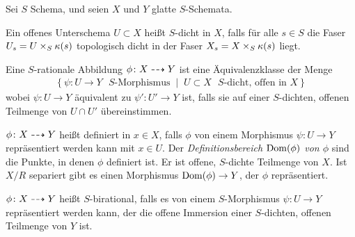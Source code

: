 \documentclass[german]{scrreprt}
\begin{document}
\begin{Definition}\label{def:ratabb}
  \cite[Chapter 2.5]{neron}
  Sei $S$ Schema, und seien $X$ und $Y$ glatte $S$-Schemata.

  Ein offenes Unterschema $U\subset X$ heißt $S$-dicht in $X$, falls
  für alle $s\in S$ die Faser $U_s=U\times_S\kappa(s)$ topologisch dicht
  in der Faser $X_s=X\times_S\kappa(s)$ liegt.

  Eine $S$-rationale Abbildung $\phi\colon X\dashrightarrow Y$ ist eine
  Äquivalenzklasse der Menge
  \begin{gather*}
    \left\{
      \psi\colon U\to Y \text{ $S$-Morphismus}
      \;\middle|\;
      U\subset X \text{ $S$-dicht, offen in $X$}
    \right\}
  \end{gather*}
  wobei $\psi\colon U\to Y$ äquivalent zu $\psi'\colon U'\to Y$ ist,
  falls sie auf einer $S$-dichten, offenen Teilmenge von $U\cap U'$
  übereinstimmen.

  $\phi\colon X\dashrightarrow Y$ heißt definiert in $x\in X$, falls $\phi$ von
  einem Morphismus $\psi\colon U\to Y$ repräsentiert werden kann mit
  $x\in U$.
  Der \emph{Definitionsbereich $\operatorname{Dom}(\phi)$ von $\phi$} sind die
  Punkte, in denen $\phi$ definiert ist. Er ist offene, $S$-dichte
  Teilmenge von $X$. Ist $X/R$ separiert gibt es einen Morphismus
  $\operatorname{Dom}(\phi)\to Y$, der $\phi$ repräsentiert.
  
  
  $\phi\colon X\dashrightarrow Y$ heißt $S$-birational, falls es von einem
  $S$-Morphismus $\psi\colon U\to Y$ repräsentiert werden kann, der
  die offene Immersion einer $S$-dichten, offenen Teilmenge von $Y$
  ist.
\end{Definition}


\nocite{*}
\printbibliography
\end{document}
